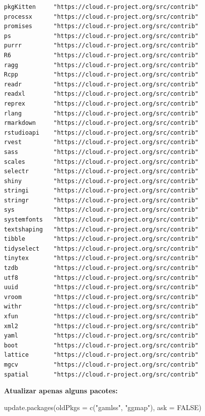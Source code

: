 \documentclass[
  letterpaper,
  DIV=11,
  numbers=noendperiod]{scrreprt}
\newenvironment{Shaded}{\begin{snugshade}}{\end{snugshade}}
\newcommand{\AttributeTok}[1]{\textcolor[rgb]{0.40,0.45,0.13}{#1}}
\newcommand{\ConstantTok}[1]{\textcolor[rgb]{0.56,0.35,0.01}{#1}}
\newcommand{\FunctionTok}[1]{\textcolor[rgb]{0.28,0.35,0.67}{#1}}
\newcommand{\NormalTok}[1]{\textcolor[rgb]{0.00,0.23,0.31}{#1}}
\newcommand{\StringTok}[1]{\textcolor[rgb]{0.13,0.47,0.30}{#1}}
\begin{document}
\begin{verbatim}
pkgKitten     "https://cloud.r-project.org/src/contrib"
processx      "https://cloud.r-project.org/src/contrib"
promises      "https://cloud.r-project.org/src/contrib"
ps            "https://cloud.r-project.org/src/contrib"
purrr         "https://cloud.r-project.org/src/contrib"
R6            "https://cloud.r-project.org/src/contrib"
ragg          "https://cloud.r-project.org/src/contrib"
Rcpp          "https://cloud.r-project.org/src/contrib"
readr         "https://cloud.r-project.org/src/contrib"
readxl        "https://cloud.r-project.org/src/contrib"
reprex        "https://cloud.r-project.org/src/contrib"
rlang         "https://cloud.r-project.org/src/contrib"
rmarkdown     "https://cloud.r-project.org/src/contrib"
rstudioapi    "https://cloud.r-project.org/src/contrib"
rvest         "https://cloud.r-project.org/src/contrib"
sass          "https://cloud.r-project.org/src/contrib"
scales        "https://cloud.r-project.org/src/contrib"
selectr       "https://cloud.r-project.org/src/contrib"
shiny         "https://cloud.r-project.org/src/contrib"
stringi       "https://cloud.r-project.org/src/contrib"
stringr       "https://cloud.r-project.org/src/contrib"
sys           "https://cloud.r-project.org/src/contrib"
systemfonts   "https://cloud.r-project.org/src/contrib"
textshaping   "https://cloud.r-project.org/src/contrib"
tibble        "https://cloud.r-project.org/src/contrib"
tidyselect    "https://cloud.r-project.org/src/contrib"
tinytex       "https://cloud.r-project.org/src/contrib"
tzdb          "https://cloud.r-project.org/src/contrib"
utf8          "https://cloud.r-project.org/src/contrib"
uuid          "https://cloud.r-project.org/src/contrib"
vroom         "https://cloud.r-project.org/src/contrib"
withr         "https://cloud.r-project.org/src/contrib"
xfun          "https://cloud.r-project.org/src/contrib"
xml2          "https://cloud.r-project.org/src/contrib"
yaml          "https://cloud.r-project.org/src/contrib"
boot          "https://cloud.r-project.org/src/contrib"
lattice       "https://cloud.r-project.org/src/contrib"
mgcv          "https://cloud.r-project.org/src/contrib"
spatial       "https://cloud.r-project.org/src/contrib"
\end{verbatim}

\textbf{Atualizar apenas alguns pacotes:}

\begin{Shaded}
\begin{Highlighting}[]
\FunctionTok{update.packages}\NormalTok{(}\AttributeTok{oldPkgs =} \FunctionTok{c}\NormalTok{(}\StringTok{"gamlss"}\NormalTok{, }\StringTok{"ggmap"}\NormalTok{), }\AttributeTok{ask =} \ConstantTok{FALSE}\NormalTok{)}
\end{Highlighting}
\end{Shaded}
\end{document}
